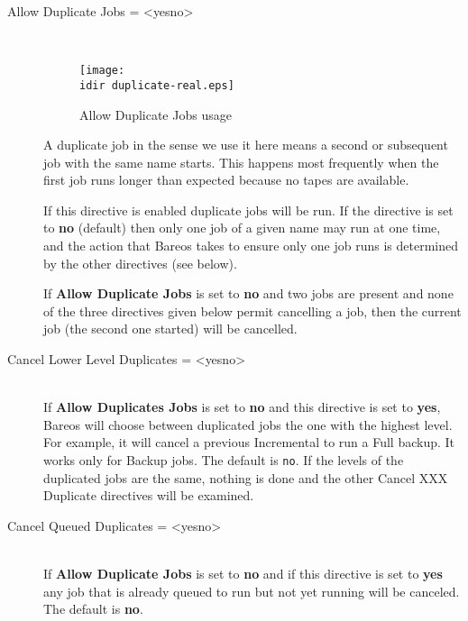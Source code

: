 \begin{description}
\item [Allow Duplicate Jobs = {\textless}yes{\textbar}no{\textgreater}] \hfill \\
\begin{figure}[htbp]
  \centering
  \texttt{[image: \\idir duplicate-real.eps]}
  \caption{Allow Duplicate Jobs usage}
  \label{fig:allowduplicatejobs}
\end{figure}
A duplicate job in the sense we use it here means a second or subsequent job
with the same name starts.  This happens most frequently when the first job
runs longer than expected because no tapes are available.

If this directive is enabled duplicate jobs will be run.  If
the directive is set to {\bf no} (default) then only one job of a given name
may run at one time, and the action that Bareos takes to ensure only
one job runs is determined by the other directives (see below).

If {\bf Allow Duplicate Jobs} is set to {\bf no} and two jobs
are present and none of the three directives given below permit
cancelling a job, then the current job (the second one started)
will be cancelled.


\item [Cancel Lower Level Duplicates = {\textless}yes{\textbar}no{\textgreater}] \hfill \\
If \textbf{Allow Duplicates Jobs} is set to \textbf{no} and this
directive is set to \textbf{yes}, Bareos will choose between duplicated
jobs the one with the highest level.  For example, it will cancel a
previous Incremental to run a Full backup.  It works only for Backup
jobs.  The default is \texttt{no}. If the levels of the duplicated
jobs are the same, nothing is done and the other
Cancel XXX Duplicate directives will be examined.

\item [Cancel Queued Duplicates = {\textless}yes{\textbar}no{\textgreater}] \hfill \\
If {\bf Allow Duplicate Jobs} is set to {\bf no} and
if this directive is set to {\bf yes} any job that is
already queued to run but not yet running will be canceled.
The default is {\bf no}.


\end{description}
